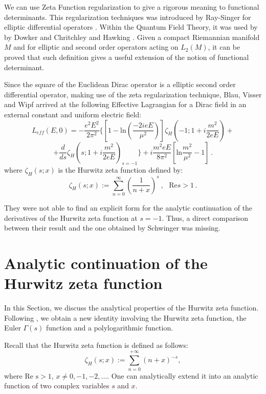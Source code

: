 \documentclass [11pt]{article}
\begin{document}
We can use Zeta Function regularization to give a rigorous meaning to 
functional  determinants. This regularization techniques was introduced
by Ray-Singer for elliptic differential operators \cite{13}. Within the 
Quantum  Field Theory, it was used by by 
 Dowker and Chritchley \cite{Dowker:1977zf}  and Hawking
\cite{Hawking:1977ja}. Given a  compact Riemannian manifold $M$ and for  elliptic and second order operators acting on $L_2(M)$,  it can be proved that such
 definition gives a useful extension of the notion of functional determinant.


 Since the square of the Euclidean Dirac operator is a elliptic second order 
 differential operator, making  use of the zeta regularization 
technique, Blau, Visser and Wipf \cite{Blau:1991iz} arrived at the following 
Effective Lagrangian for a Dirac field in an external constant and uniform electric field:
\begin{equation}
\label{leff}
L_{eff}(E,0)=-\frac{e^{2}E^{2}}{2\pi ^{2}}\{[1-\mbox{ln}
(\frac{-2ieE}{\mu ^{2}})]\zeta _{H}(-1;1+i\frac{m^{2}}{2eE})+
\end{equation}
\begin{equation}\nonumber
+\frac{d}{ds}\zeta _{H}(s;1+i\frac{m^{2}}{2eE})_{s=-1}\}+i\frac{m^{2}eE}{8\pi ^{2}}[\mbox{ln}\frac{m^{2}}{\mu ^{2}}-1]\, .
\end{equation}
  where $\zeta_{H}(s;x)$ is the Hurwitz zeta function defined by:
\begin{equation}\nonumber
\zeta_{H}(s;x):=\sum^{\infty}_{n=0}\left(\frac{1}{n+x}\right)^s\:,\,\,\,\,
\mbox{Re}s>1 \,.
\end{equation}
   
They were not able to find an explicit form for the analytic continuation of 
the derivatives of the Hurwitz zeta function at $s=-1$.  Thus, a 
direct comparison between their result and the one  obtained by Schwinger 
was missing.



\section{Analytic continuation of the Hurwitz zeta function}


In this Section, we discuss the analytical properties of the Hurwitz zeta 
function.
Following \cite{8}, we obtain a new identity involving 
the Hurwitz zeta function, the Euler $\Gamma(s)$ function and a polylogarithmic function. 

Recall that the  Hurwitz zeta function is  defined as follows:
\begin{equation}
\label{Hurwitz}
\zeta_H(s;x):=\sum _{n=0}^{+\infty }(n+x)^{-s},
\end{equation}
where $\mbox{Re s} >1$, $ x \neq 0, -1, -2,... $.
One can analytically extend it into an analytic function of two complex 
variables  $s$ and $x$.
\end{document}
